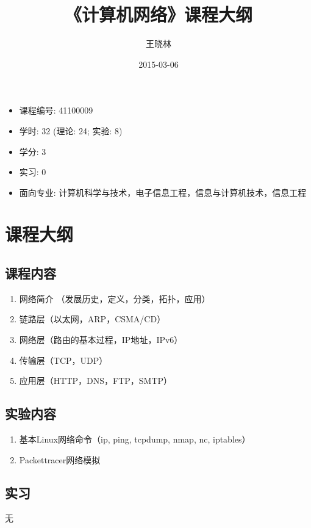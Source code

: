\documentclass{wx672article}
\title{《计算机网络》课程大纲}
\author{王晓林}
\date{2015-03-06}
\begin{document}
\maketitle
\tableofcontents
\clearpage

\begin{itemize}
\item 课程编号: 41100009
\item 学时: 32 (理论: 24; 实验: 8)
\item 学分: 3
\item 实习: 0 
\item 面向专业: 计算机科学与技术，电子信息工程，信息与计算机技术，信息工程
\end{itemize}

\section{课程大纲}
\label{sec-1}

\subsection{课程内容}
\label{sec-1-1}

\begin{enumerate}
\item 网络简介 （发展历史，定义，分类，拓扑，应用）
\item 链路层（以太网，ARP，CSMA/CD）
\item 网络层（路由的基本过程，IP地址，IPv6）
\item 传输层（TCP，UDP）
\item 应用层（HTTP，DNS，FTP，SMTP）
\end{enumerate}

\subsection{实验内容}
\label{sec-1-2}


\begin{enumerate}
\item 基本Linux网络命令（ip, ping, tcpdump, nmap, nc, iptables）
\item Packettracer网络模拟
\end{enumerate}

\subsection{实习}
\label{sec-1-3}

无
\end{document}
